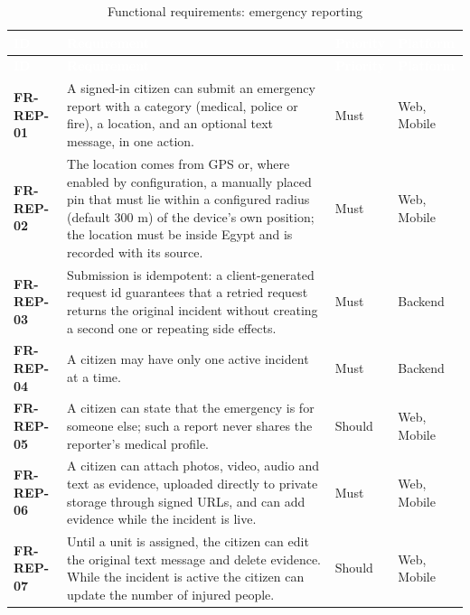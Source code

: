 {\tabfont\rowband
\begin{longtable}{@{}>{\raggedright\arraybackslash}p{}>{\raggedright\arraybackslash}p{}>{\raggedright\arraybackslash}p{}>{\raggedright\arraybackslash}p{}@{}}
\caption{Functional requirements: emergency reporting}\label{tab:fr-rep}\\
\rowcolor{najdanavy}\textcolor{white}{\sffamily\bfseries\small ID} & \textcolor{white}{\sffamily\bfseries\small Requirement} & \textcolor{white}{\sffamily\bfseries\small Priority} & \textcolor{white}{\sffamily\bfseries\small Platform}\\
\endfirsthead
\rowcolor{najdanavy}\textcolor{white}{\sffamily\bfseries\small ID} & \textcolor{white}{\sffamily\bfseries\small Requirement} & \textcolor{white}{\sffamily\bfseries\small Priority} & \textcolor{white}{\sffamily\bfseries\small Platform}\\
\endhead
\bottomrule\endlastfoot
\textbf{FR-REP-01} & A signed-in citizen can submit an emergency report with a category (medical, police or fire), a location, and an optional text message, in one action. & Must & Web, Mobile\\
\textbf{FR-REP-02} & The location comes from GPS or, where enabled by configuration, a manually placed pin that must lie within a configured radius (default 300 m) of the device’s own position; the location must be inside Egypt and is recorded with its source. & Must & Web, Mobile\\
\textbf{FR-REP-03} & Submission is idempotent: a client-generated request id guarantees that a retried request returns the original incident without creating a second one or repeating side effects. & Must & Backend\\
\textbf{FR-REP-04} & A citizen may have only one active incident at a time. & Must & Backend\\
\textbf{FR-REP-05} & A citizen can state that the emergency is for someone else; such a report never shares the reporter’s medical profile. & Should & Web, Mobile\\
\textbf{FR-REP-06} & A citizen can attach photos, video, audio and text as evidence, uploaded directly to private storage through signed URLs, and can add evidence while the incident is live. & Must & Web, Mobile\\
\textbf{FR-REP-07} & Until a unit is assigned, the citizen can edit the original text message and delete evidence. While the incident is active the citizen can update the number of injured people. & Should & Web, Mobile\\

\end{longtable}}

